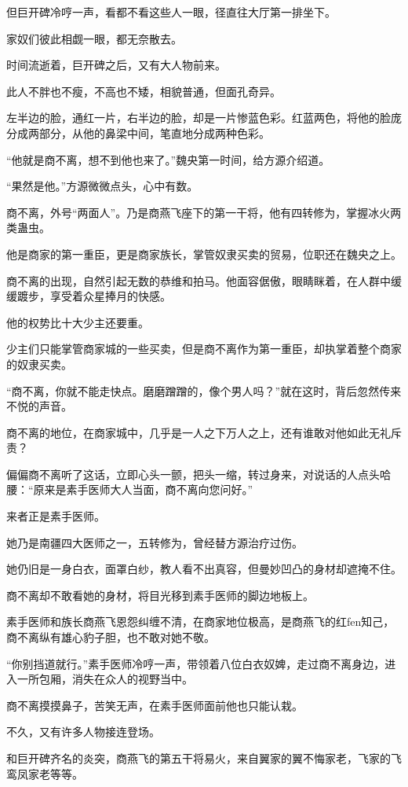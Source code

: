 \begin{this_body}
但巨开碑冷哼一声，看都不看这些人一眼，径直往大厅第一排坐下。

家奴们彼此相觑一眼，都无奈散去。

时间流逝着，巨开碑之后，又有大人物前来。

此人不胖也不瘦，不高也不矮，相貌普通，但面孔奇异。

左半边的脸，通红一片，右半边的脸，却是一片惨蓝色彩。红蓝两色，将他的脸庞分成两部分，从他的鼻梁中间，笔直地分成两种色彩。

“他就是商不离，想不到他也来了。”魏央第一时间，给方源介绍道。

“果然是他。”方源微微点头，心中有数。

商不离，外号“两面人”。乃是商燕飞座下的第一干将，他有四转修为，掌握冰火两类蛊虫。

他是商家的第一重臣，更是商家族长，掌管奴隶买卖的贸易，位职还在魏央之上。

商不离的出现，自然引起无数的恭维和拍马。他面容倨傲，眼睛眯着，在人群中缓缓踱步，享受着众星捧月的快感。

他的权势比十大少主还要重。

少主们只能掌管商家城的一些买卖，但是商不离作为第一重臣，却执掌着整个商家的奴隶买卖。

“商不离，你就不能走快点。磨磨蹭蹭的，像个男人吗？”就在这时，背后忽然传来不悦的声音。

商不离的地位，在商家城中，几乎是一人之下万人之上，还有谁敢对他如此无礼斥责？

偏偏商不离听了这话，立即心头一颤，把头一缩，转过身来，对说话的人点头哈腰：“原来是素手医师大人当面，商不离向您问好。”

来者正是素手医师。

她乃是南疆四大医师之一，五转修为，曾经替方源治疗过伤。

她仍旧是一身白衣，面罩白纱，教人看不出真容，但曼妙凹凸的身材却遮掩不住。

商不离却不敢看她的身材，将目光移到素手医师的脚边地板上。

素手医师和族长商燕飞恩怨纠缠不清，在商家地位极高，是商燕飞的红fen知己，商不离纵有雄心豹子胆，也不敢对她不敬。

“你别挡道就行。”素手医师冷哼一声，带领着八位白衣奴婢，走过商不离身边，进入一所包厢，消失在众人的视野当中。

商不离摸摸鼻子，苦笑无声，在素手医师面前他也只能认栽。

不久，又有许多人物接连登场。

和巨开碑齐名的炎突，商燕飞的第五干将易火，来自翼家的翼不悔家老，飞家的飞鸾凤家老等等。


\end{this_body}
